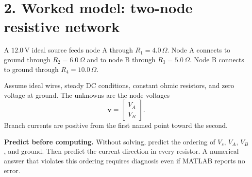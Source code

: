 \documentclass[11pt,a4paper]{article}
\begin{document}
\begin{center}
\end{center}

\section*{2. Worked model: two-node resistive network}
A $12.0\,\mathrm{V}$ ideal source feeds node A through $R_1=4.0\,\Omega$. Node A connects to ground through $R_2=6.0\,\Omega$ and to node B through $R_3=5.0\,\Omega$. Node B connects to ground through $R_4=10.0\,\Omega$.

Assume ideal wires, steady DC conditions, constant ohmic resistors, and zero voltage at ground. The unknowns are the node voltages
\begin{equation}
  \mathbf{v}=\begin{bmatrix}V_A\\V_B\end{bmatrix}.
\end{equation}
Branch currents are positive from the first named point toward the second.

\begin{checkbox}
\textbf{Predict before computing.} Without solving, predict the ordering of $V_s$, $V_A$, $V_B$, and ground. Then predict the current direction in every resistor. A numerical answer that violates this ordering requires diagnosis even if MATLAB reports no error.
\end{checkbox}
\end{document}
